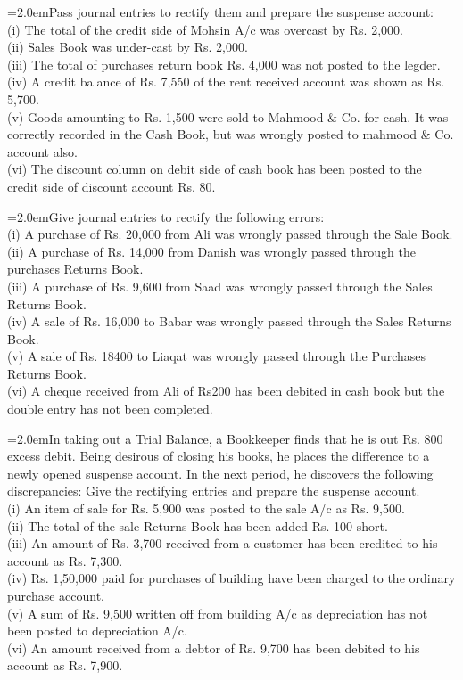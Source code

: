 \documentclass[11pt,a4paper]{article}
\newcommand{\lqn}[2]{\Needspace{6\baselineskip}\par\medskip\noindent\hangindent=2.0em\hangafter=1\makebox[2.0em][l]{\textbf{#1.}}#2\par}
\begin{document}
\lqn{145}{Pass journal entries to rectify them and prepare the suspense account:\\
(i) The total of the credit side of Mohsin A/c was overcast by Rs. 2,000.\\
(ii) Sales Book was under-cast by Rs. 2,000.\\
(iii) The total of purchases return book Rs. 4,000 was not posted to the legder.\\
(iv) A credit balance of Rs. 7,550 of the rent received account was shown as Rs. 5,700.\\
(v) Goods amounting to Rs. 1,500 were sold to Mahmood \& Co. for cash. It was correctly recorded in the Cash Book, but was wrongly posted to mahmood \& Co. account also.\\
(vi) The discount column on debit side of cash book has been posted to the credit side of discount account Rs. 80.\par
}
\lqn{146}{Give journal entries to rectify the following errors:\\
(i) A purchase of Rs. 20,000 from Ali was wrongly passed through the Sale Book.\\
(ii) A purchase of Rs. 14,000 from Danish was wrongly passed through the purchases Returns Book.\\
(iii) A purchase of Rs. 9,600 from Saad was wrongly passed through the Sales Returns Book.\\
(iv) A sale of Rs. 16,000 to Babar was wrongly passed through the Sales Returns Book.\\
(v) A sale of Rs. 18400 to Liaqat was wrongly passed through the Purchases Returns Book.\\
(vi) A cheque received from Ali of Rs200 has been debited in cash book but the double entry has not been completed.\par
}
\lqn{147}{In taking out a Trial Balance, a Bookkeeper finds that he is out Rs. 800 excess debit. Being desirous of closing his books, he places the difference to a newly opened suspense account. In the next period, he discovers the following discrepancies: Give the rectifying entries and prepare the suspense account.\\
(i) An item of sale for Rs. 5,900 was posted to the sale A/c as Rs. 9,500.\\
(ii) The total of the sale Returns Book has been added Rs. 100 short.\\
(iii) An amount of Rs. 3,700 received from a customer has been credited to his account as Rs. 7,300.\\
(iv) Rs. 1,50,000 paid for purchases of building have been charged to the ordinary purchase account.\\
(v) A sum of Rs. 9,500 written off from building A/c as depreciation has not been posted to depreciation A/c.\\
(vi) An amount received from a debtor of Rs. 9,700 has been debited to his account as Rs. 7,900.\par
}
\end{document}
